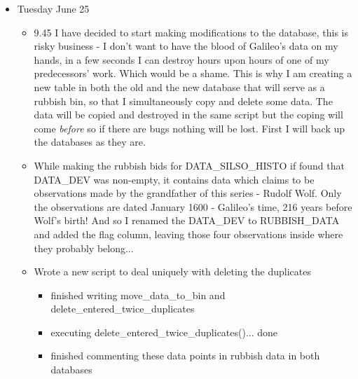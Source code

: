 \documentclass[12pt]{article}
\begin{document}
\begin{itemize}
\item Tuesday June 25
    \begin{itemize}
        \item 9.45 I have decided to start making modifications to the database, this is risky business - I don't want to have the blood of Galileo's data on my hands, in a few seconds I can destroy hours upon hours of one of my predecessors' work. Which would be a shame. This is why I am creating a new table in both the old and the new database that will serve as a rubbish bin, so that I simultaneously copy and delete some data. The data will be copied and destroyed in the same script but the coping will come \textit{before} so if there are bugs nothing will be lost. First I will back up the databases as they are.
        \item While making the rubbish bids for DATA\_SILSO\_HISTO if found that DATA\_DEV was non-empty, it contains data which claims to be observations made by the grandfather of this series - Rudolf Wolf. Only the observations are dated January 1600 - Galileo's time, 216 years before Wolf's birth! And so I renamed the DATA\_DEV to RUBBISH\_DATA and added the flag column, leaving those four observations inside where they probably belong...
        \item Wrote a new script to deal uniquely with deleting the duplicates
        \begin{itemize}
            \item finished writing move\_data\_to\_bin and delete\_entered\_twice\_duplicates
            \item executing delete\_entered\_twice\_duplicates()... done
            \item finished commenting these data points in rubbish data in both databases
        \end{itemize}
    \end{itemize}
    

\end{itemize}
\end{document}
